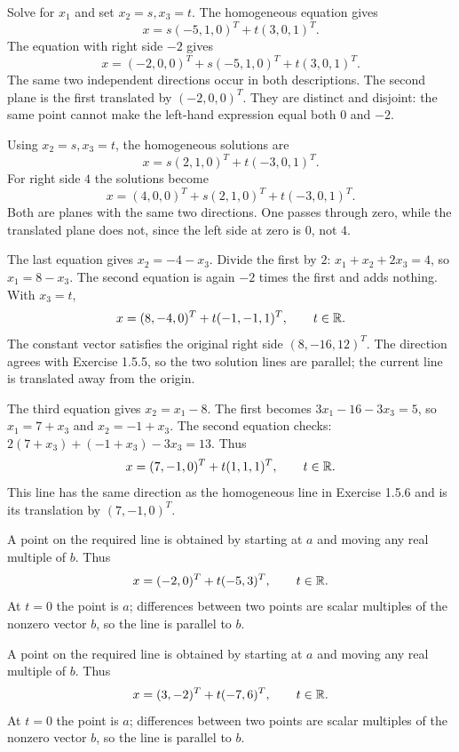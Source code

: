 Solve for $x_1$ and set $x_2=s,x_3=t$. The homogeneous equation gives
\[x=s(-5,1,0)^T+t(3,0,1)^T.\]
The equation with right side $-2$ gives
\[x=(-2,0,0)^T+s(-5,1,0)^T+t(3,0,1)^T.\]
The same two independent directions occur in both descriptions.
The second plane is the first translated by $(-2,0,0)^T$.
They are distinct and disjoint: the same point cannot make the
left-hand expression equal both $0$ and $-2$.

Using $x_2=s,x_3=t$, the homogeneous solutions are
\[x=s(2,1,0)^T+t(-3,0,1)^T.\]
For right side $4$ the solutions become
\[x=(4,0,0)^T+s(2,1,0)^T+t(-3,0,1)^T.\]
Both are planes with the same two directions. One passes through
zero, while the translated plane does not, since the left side at
zero is $0$, not $4$.

The last equation gives $x_2=-4-x_3$. Divide the first by $2$:
$x_1+x_2+2x_3=4$, so $x_1=8-x_3$. The second equation is again
$-2$ times the first and adds nothing. With $x_3=t$,
\[x=(8,-4,0)^T+t(-1,-1,1)^T,\qquad t\in\mathbb{R}.\]
The constant vector satisfies the original right side $(8,-16,12)^T$.
The direction agrees with Exercise 1.5.5, so the two solution lines
are parallel; the current line is translated away from the origin.

The third equation gives $x_2=x_1-8$. The first becomes
$3x_1-16-3x_3=5$, so $x_1=7+x_3$ and $x_2=-1+x_3$.
The second equation checks: $2(7+x_3)+(-1+x_3)-3x_3=13$.
Thus
\[x=(7,-1,0)^T+t(1,1,1)^T,\qquad t\in\mathbb{R}.\]
This line has the same direction as the homogeneous line in
Exercise 1.5.6 and is its translation by $(7,-1,0)^T$.

A point on the required line is obtained by starting at $a$ and
moving any real multiple of $b$. Thus
\[x=(-2,0)^T+t(-5,3)^T,\qquad t\in\mathbb{R}.\]
At $t=0$ the point is $a$; differences between two points are scalar
multiples of the nonzero vector $b$, so the line is parallel to $b$.

A point on the required line is obtained by starting at $a$ and
moving any real multiple of $b$. Thus
\[x=(3,-2)^T+t(-7,6)^T,\qquad t\in\mathbb{R}.\]
At $t=0$ the point is $a$; differences between two points are scalar
multiples of the nonzero vector $b$, so the line is parallel to $b$.

